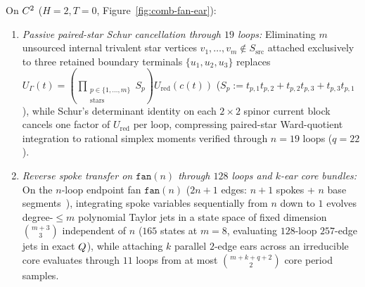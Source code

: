\begin{proposition}
\label{prop:passive-comb-fan-ear}
On $C^2$ ($H=2, T=0$, Figure~\ref{fig:comb-fan-ear}):
\begin{enumerate}[label=(\arabic*),leftmargin=*]
  \item \emph{Passive paired-star Schur cancellation through $19$ loops:} Eliminating $m$ unsourced internal trivalent star vertices $v_1,\dots,v_m \notin S_{\mathrm{src}}$ attached exclusively to three retained boundary terminals $\{u_1,u_2,u_3\}$ replaces $U_\Gamma(t) = (\prod_{\substack{p\in\{1,\dots,m\}\\\mathrm{stars}}}S_p)U_{\mathrm{red}}(c(t))$ ($S_p := t_{p,1}t_{p,2} + t_{p,2}t_{p,3} + t_{p,3}t_{p,1}$), while Schur's determinant identity on each $2\times 2$ spinor current block cancels one factor of $U_{\mathrm{red}}$ per loop, compressing paired-star Ward-quotient integration to rational simplex moments verified through $n = 19$ loops ($q = 22$).

  \item \emph{Reverse spoke transfer on $\texttt{fan}(n)$ through $128$ loops and $k$-ear core bundles:} On the $n$-loop endpoint fan $\texttt{fan}(n)$ ($2n+1$ edges: $n+1$ spokes + $n$ base segments~\cite{LLC}), integrating spoke variables sequentially from $n$ down to $1$ evolves degree-$\le m$ polynomial Taylor jets in a state space of fixed dimension $\binom{m+3}{3}$ independent of $n$ ($165$ states at $m=8$, evaluating $128$-loop $257$-edge jets in exact $Q$), while attaching $k$ parallel $2$-edge ears across an irreducible core evaluates through $11$ loops from at most $\binom{m+k+q+2}{2}$ core period samples.
\end{enumerate}
\end{proposition}

